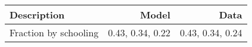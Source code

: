 \begin{tabular}{lrr}
\hline
Description & Model  & Data  \\
\hline
Fraction by schooling & 0.43, 0.34, 0.22  & 0.43, 0.34, 0.24  \\
\hline
\end{tabular}%
